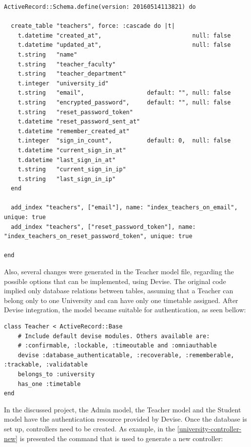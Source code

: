  \begin{lstlisting}[caption={Teacher Schema using Devise},label={teacher-schema}]
ActiveRecord::Schema.define(version: 20160514113821) do

  create_table "teachers", force: :cascade do |t|
    t.datetime "created_at",                          null: false
    t.datetime "updated_at",                          null: false
    t.string   "name"
    t.string   "teacher_faculty"
    t.string   "teacher_department"
    t.integer  "university_id"
    t.string   "email",                  default: "", null: false
    t.string   "encrypted_password",     default: "", null: false
    t.string   "reset_password_token"
    t.datetime "reset_password_sent_at"
    t.datetime "remember_created_at"
    t.integer  "sign_in_count",          default: 0,  null: false
    t.datetime "current_sign_in_at"
    t.datetime "last_sign_in_at"
    t.string   "current_sign_in_ip"
    t.string   "last_sign_in_ip"
  end

  add_index "teachers", ["email"], name: "index_teachers_on_email", unique: true
  add_index "teachers", ["reset_password_token"], name: "index_teachers_on_reset_password_token", unique: true

end
\end{lstlisting}
\bigskip

Also, several changes were generated in the Teacher model file, regarding the possible options that can be implemented, using Devise. The original code implied only database relations between tables, assuming that a Teacher can belong only to one University and can have only one timetable assigned. After Devise integration, the model became suitable for authentication, as seen bellow:

\begin{lstlisting}[caption={Teacher Model using Devise},label={teacher-model}]
class Teacher < ActiveRecord::Base
  	# Include default devise modules. Others available are:
  	# :confirmable, :lockable, :timeoutable and :omniauthable
  	devise :database_authenticatable, :recoverable, :rememberable, :trackable, :validatable
	belongs_to :university
	has_one :timetable
end

\end{lstlisting}
\bigskip

In the discussed project, the Admin model, the Teacher model and the Student model have the authentication resource provided by Devise. Once the database is set up, controllers need to be created. As example, in the \autoref{university-controller-new} is presented the command that is used to generate a new controller:

